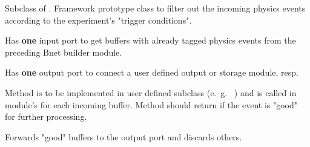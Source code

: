 \begin{description}
Subclass of . 
   Framework prototype class to filter out the incoming physics events 
   according to the experiment's "trigger conditions". 
\begin{compactenum}
  \item Has {\bf one} input port to get buffers with 
      already tagged physics events from the preceding Bnet builder module.
  \item Has {\bf one} output port to connect a user defined output or storage module, resp.
  \item Method  is to be implemented in user 
      defined subclass (e.~g.~ ) and is called in 
      module's  for each incoming buffer. 
      Method should return  if the event is "good" for further processing.
  \item Forwards "good" buffers to the output port and discards others.
\end{compactenum}
\end{description}

